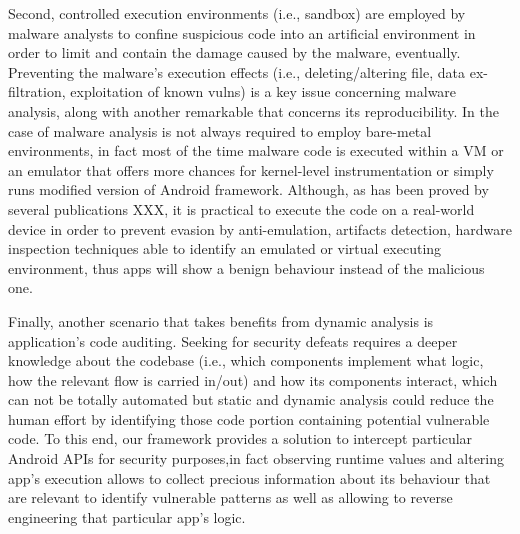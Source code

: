 Second, controlled execution environments (i.e., sandbox) are employed by malware analysts to confine suspicious code into an artificial environment in order to limit and contain the damage caused by the malware, eventually. Preventing the malware's execution effects (i.e., deleting/altering file, data ex-filtration, exploitation of known vulns) is a key issue concerning malware analysis, along with another remarkable that concerns its reproducibility. In the case of malware analysis is not always required to employ bare-metal environments, in fact most of the time malware code is executed within a VM or an emulator that offers more chances for kernel-level instrumentation or simply runs modified version of Android framework. Although, as has been proved by several publications XXX, it is practical to execute the code on a real-world device in order to prevent evasion by anti-emulation, artifacts detection, hardware inspection techniques able to identify an emulated or virtual executing environment, thus apps will show a benign behaviour instead of the malicious one.


Finally, another scenario that takes benefits from dynamic analysis  is application's code auditing. Seeking for security defeats requires a deeper knowledge about the codebase (i.e., which components implement what logic, how the relevant flow is carried in/out) and how its components interact, which can not be totally automated but static and dynamic analysis could reduce the human effort by identifying those code portion containing potential vulnerable code. To this end, our framework provides a solution to intercept particular Android APIs for security purposes,in fact observing runtime values and altering app's execution allows to collect precious information about its behaviour that are relevant to identify vulnerable patterns as well as allowing to reverse engineering that particular app's logic. 

